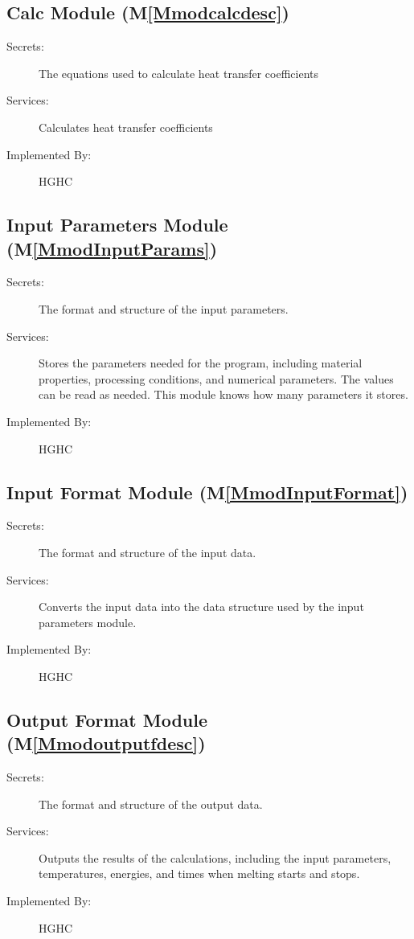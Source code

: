 \documentclass[12pt]{article}
\begin{document}
\subsection{Calc Module (M\ref{Mmodcalcdesc})}
\label{Sec:CM()}
\begin{description}
\item[Secrets:]The equations used to calculate heat transfer coefficients
\item[Services:]Calculates heat transfer coefficients
\item[Implemented By:]HGHC
\end{description}
\subsection{Input Parameters Module (M\ref{MmodInputParams})}
\label{Sec:IPM()}
\begin{description}
\item[Secrets:]The format and structure of the input parameters.
\item[Services:]Stores the parameters needed for the program, including material properties, processing conditions, and numerical parameters. The values can be read as needed. This module knows how many parameters it stores.
\item[Implemented By:]HGHC
\end{description}
\subsection{Input Format Module (M\ref{MmodInputFormat})}
\label{Sec:IFM()}
\begin{description}
\item[Secrets:]The format and structure of the input data.
\item[Services:]Converts the input data into the data structure used by the input parameters module.
\item[Implemented By:]HGHC
\end{description}
\subsection{Output Format Module (M\ref{Mmodoutputfdesc})}
\label{Sec:OFM()}
\begin{description}
\item[Secrets:]The format and structure of the output data.
\item[Services:]Outputs the results of the calculations, including the input parameters, temperatures, energies, and times when melting starts and stops.
\item[Implemented By:]HGHC
\end{description}
\end{document}
